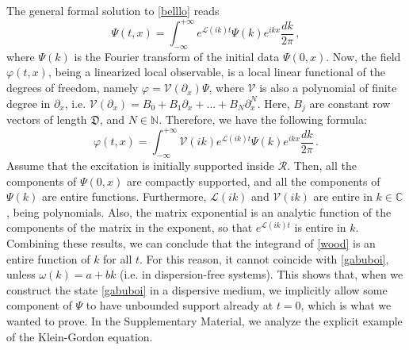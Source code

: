 \documentclass[prl, amsfonts, amssymb, amsmath, nofootinbib,reprint, showkeys, twoside,notitlepage]{revtex4-2}
\theoremstyle{definition}
\theoremstyle{theorem}
\theoremstyle{corollary}
\begin{document}
The general formal solution to \eqref{belllo} reads
\begin{equation}\label{DoFF}
\Psi(t,x) = \int_{-\infty}^{+\infty} e^{\mathcal{L}(ik)t}\Psi(k)e^{ikx} \dfrac{dk}{2\pi} \, ,
\end{equation}
where $\Psi(k)$ is the Fourier transform of the initial data $\Psi(0,x)$. Now, the field $\varphi(t,x)$, being a linearized local observable, is a local linear functional of the degrees of freedom, namely $\varphi=\mathcal{V}(\partial_x)\Psi$, where $\mathcal{V}$ is also a polynomial of finite degree in $\partial_x$, i.e. $\mathcal{V}(\partial_x)=B_0 +B_1 \partial_x+...+B_N \partial_x^N$. Here, $B_j$ are constant row vectors of length $\mathfrak{D}$, and $N \in \mathbb{N}$. Therefore, we have the following formula:
\begin{equation}\label{wood}
\varphi(t,x) = \int_{-\infty}^{+\infty} \mathcal{V}(ik) e^{\mathcal{L}(ik)t}\Psi(k)e^{ikx} \dfrac{dk}{2\pi} \, .
\end{equation} 
Assume that the excitation is initially supported inside $\mathcal{R}$. Then, all the components of $\Psi(0,x)$ are compactly supported, and all the components of $\Psi(k)$ are entire functions. Furthermore, $\mathcal{L}(ik)$ and $\mathcal{V}(ik)$ are entire in $k\in \mathbb{C}$, being polynomials. Also, the matrix exponential is an analytic function of the components of the matrix in the exponent, so that $e^{\mathcal{L}(ik)t}$ is entire in $k$. Combining these results, we can conclude that the integrand of \eqref{wood} is an entire function of $k$ for all $t$. For this reason, it cannot coincide with \eqref{gabuboi}, unless $\omega(k) =a+bk$ (i.e. in dispersion-free systems). This shows that, when we construct the state \eqref{gabuboi} in a dispersive medium, we implicitly allow some component of $\Psi$ to have unbounded support already at $t=0$, which is what we wanted to prove. 
In the Supplementary Material, we analyze the explicit example of the Klein-Gordon equation.
\end{document}
